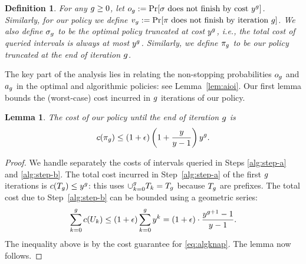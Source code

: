 \documentclass[11pt]{article}
\newcommand{\base}{y}
\newtheorem{lem}[thm]{Lemma}
\newtheorem{defn}[thm]{Definition}
\theoremstyle{remark}
\theoremstyle{plain}
\theoremstyle{remark}
\begin{document}
 \begin{defn}
\label{def:ai}
    For any $g \ge 0$, let $ o_\i := \Pr[ \sigma \text{ does not finish by cost }\base^\i]$. 
    Similarly, for our policy we define $v_g := \Pr[\pi \text{ does not finish by iteration }g]$.   
We also define $\sigma_g$ to be the optimal policy truncated at cost $\base^\i$, i.e., the total cost of queried intervals is always at most $\base^\i$. Similarly, we define $\pi_g$ to be our policy truncated at the end of iteration $g$.
\end{defn}

The key part of the analysis lies in relating the non-stopping probabilities $o_g$ and $a_g$ in the optimal and algorithmic policies: see Lemma~\ref{lem:aioi}. Our first lemma  bounds the (worst-case) cost incurred in $g$ iterations of our policy.



\begin{lem}
\label{lem:grdup}The cost of our policy until the end of iteration $g$  is
   \[c(\pi_\i)  \leq (1 + \epsilon) \left(1 + \dfrac{\base}{\base - 1}  \right)\base^\i. \]
\end{lem}
\begin{proof}
We    handle separately the costs of intervals queried in Steps \ref{alg:step-a}   and \ref{alg:step-b}. The total cost incurred in Step~\ref{alg:step-a} of the first $g$ iterations is $c(T_\i)\le \base^\i$: this uses  $\cup_{k=0}^g T_k  = T_g $ because  $T_g$ are prefixes. The total cost due to Step~\ref{alg:step-b} can be bounded using a geometric series:  
$$\sum_{k=0}^\i c(U_k) \le (1+\epsilon) \sum_{k=0}^\i \base^k=(1 + \epsilon) \cdot \dfrac{\base^{\i+1} - 1}{\base - 1}.$$
The inequality above is by the cost guarantee for \eqref{eq:algknap}. The lemma now follows. 
\end{proof}
\end{document}
